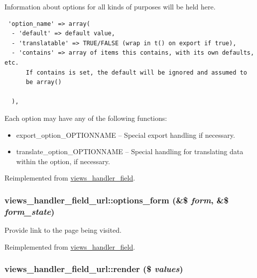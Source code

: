 Information about options for all kinds of purposes will be held here. 

\begin{Code}\begin{verbatim} 'option_name' => array(
  - 'default' => default value,
  - 'translatable' => TRUE/FALSE (wrap in t() on export if true),
  - 'contains' => array of items this contains, with its own defaults, etc.
      If contains is set, the default will be ignored and assumed to
      be array()

  ),
\end{verbatim}
\end{Code}

 Each option may have any of the following functions:\begin{itemize}
\item export\_\-option\_\-OPTIONNAME -- Special export handling if necessary.\item translate\_\-option\_\-OPTIONNAME -- Special handling for translating data within the option, if necessary. \end{itemize}


Reimplemented from \hyperlink{classviews__handler__field_64c69a8a3697603f8283405071c25b76}{views\_\-handler\_\-field}.\hypertarget{classviews__handler__field__url_47ffe90c19fe1a114df84f5779567cd3}{
\subsubsection[{options\_\-form}]{\setlength{\rightskip}{0pt plus 5cm}views\_\-handler\_\-field\_\-url::options\_\-form (\&\$ {\em form}, \/  \&\$ {\em form\_\-state})}}
\label{classviews__handler__field__url_47ffe90c19fe1a114df84f5779567cd3}


Provide link to the page being visited. 

Reimplemented from \hyperlink{classviews__handler__field_0435d161922b7b4b84f02a2e79bb947a}{views\_\-handler\_\-field}.\hypertarget{classviews__handler__field__url_6f96c8adfdd1892619793359448e70ad}{
\subsubsection[{render}]{\setlength{\rightskip}{0pt plus 5cm}views\_\-handler\_\-field\_\-url::render (\$ {\em values})}}
\label{classviews__handler__field__url_6f96c8adfdd1892619793359448e70ad}



